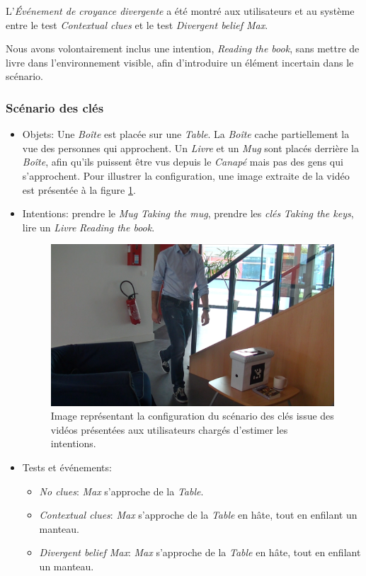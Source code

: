 \documentclass[a4paper,11pt,twoside]{StyleThese}
\begin{document}
L'\textit{Événement de croyance divergente} a été montré aux utilisateurs et au système entre le test \textit{Contextual clues} et le test \textit{Divergent belief Max}. 

Nous avons volontairement inclus une intention, \textit{Reading the book}, sans mettre de livre dans l'environnement visible, afin d'introduire un élément incertain dans le scénario.

\subsubsection{Scénario des clés}
\begin{itemize}

\item Objets: Une \textit{Boîte} est placée sur une \textit{Table}. La \textit{Boîte} cache partiellement la vue des personnes qui approchent. Un \textit{Livre} et un \textit{Mug} sont placés derrière la \textit{Boîte}, afin qu'ils puissent être vus depuis le \textit{Canapé} mais pas des gens qui s'approchent. Pour illustrer la configuration, une image extraite de la vidéo est présentée à la figure \ref{fig:keyScen}.

\item Intentions: prendre le \textit{Mug} \textit{Taking the mug}, prendre les \textit{clés} \textit{Taking the keys}, lire un \textit{Livre} \textit{Reading the book}.



\begin{figure}[ht!]
  \centering
 \includegraphics[width=0.8\linewidth]{./intention/keys1.png} 
  \caption {Image représentant la configuration du scénario des clés issue des vidéos présentées aux utilisateurs chargés d'estimer les intentions.}
  \label{fig:keyScen}
\end{figure}


\item Tests et événements:
\begin{itemize}
\item \textit{No clues}: \textit{Max} s'approche de la \textit{Table}.
\item\textit{Contextual clues}: \textit{Max} s'approche de la \textit{Table} en hâte, tout en enfilant un manteau.
\item \textit{Divergent belief Max}: \textit{Max} s'approche de la \textit{Table} en hâte, tout en enfilant un manteau.
\end{itemize}


\end{itemize}
\end{document}
